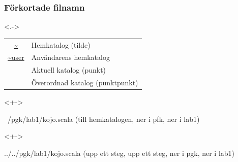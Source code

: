 



\begin{frame}[fragile,t]
    \frametitle{Förkortade filnamn}



    \blankline
    \begin{onlyenv}<.->
        \begin{tabular}{cl}
            \url{~}     & Hemkatalog (tilde)              \\
            \url{~user} & Användarens hemkatalog          \\
            \code{.}    & Aktuell katalog (punkt)         \\
            \code{..}   & Överordnad katalog (punktpunkt) \\
        \end{tabular}
    \end{onlyenv}
    \blankline



    \begin{onlyenv}<+->
        \begin{GobbleCode}{10}
            ~/pgk/lab1/kojo.scala
            (till hemkatalogen, ner i pfk, ner i lab1)
        \end{GobbleCode}
    \end{onlyenv}
    \vspace{-1em}
    \begin{onlyenv}<+->
        \begin{GobbleCode}{10}
            ../../pgk/lab1/kojo.scala
            (upp ett steg, upp ett steg, ner i pgk, ner i lab1)
        \end{GobbleCode}
    \end{onlyenv}

\end{frame}


